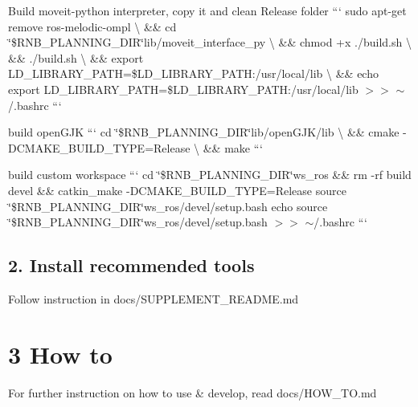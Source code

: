 \begin{DoxyItemize}
\item Build moveit-\/python interpreter, copy it and clean Release folder ``` sudo apt-\/get remove ros-\/melodic-\/ompl \textbackslash{} \&\& cd \char`\"{}\$\+R\+N\+B\+\_\+\+P\+L\+A\+N\+N\+I\+N\+G\+\_\+\+D\+I\+R\char`\"{}lib/moveit\+\_\+interface\+\_\+py \textbackslash{} \&\& chmod +x ./build.sh \textbackslash{} \&\& ./build.sh \textbackslash{} \&\& export L\+D\+\_\+\+L\+I\+B\+R\+A\+R\+Y\+\_\+\+P\+A\+TH=\$\+L\+D\+\_\+\+L\+I\+B\+R\+A\+R\+Y\+\_\+\+P\+A\+TH\+:/usr/local/lib \textbackslash{} \&\& echo \textquotesingle{}export L\+D\+\_\+\+L\+I\+B\+R\+A\+R\+Y\+\_\+\+P\+A\+TH=\$\+L\+D\+\_\+\+L\+I\+B\+R\+A\+R\+Y\+\_\+\+P\+A\+TH\+:/usr/local/lib\textquotesingle{} $>$$>$ $\sim$/.bashrc ```
\item build open\+G\+JK ``` cd \char`\"{}\$\+R\+N\+B\+\_\+\+P\+L\+A\+N\+N\+I\+N\+G\+\_\+\+D\+I\+R\char`\"{}lib/open\+G\+J\+K/lib \textbackslash{} \&\& cmake -\/\+D\+C\+M\+A\+K\+E\+\_\+\+B\+U\+I\+L\+D\+\_\+\+T\+Y\+PE=Release \textbackslash{} \&\& make ```
\item build custom workspace ``` cd \char`\"{}\$\+R\+N\+B\+\_\+\+P\+L\+A\+N\+N\+I\+N\+G\+\_\+\+D\+I\+R\char`\"{}ws\+\_\+ros \&\& rm -\/rf build devel \&\& catkin\+\_\+make -\/\+D\+C\+M\+A\+K\+E\+\_\+\+B\+U\+I\+L\+D\+\_\+\+T\+Y\+PE=Release source \char`\"{}\$\+R\+N\+B\+\_\+\+P\+L\+A\+N\+N\+I\+N\+G\+\_\+\+D\+I\+R\char`\"{}ws\+\_\+ros/devel/setup.\+bash echo \textquotesingle{}source \char`\"{}\$\+R\+N\+B\+\_\+\+P\+L\+A\+N\+N\+I\+N\+G\+\_\+\+D\+I\+R\char`\"{}ws\+\_\+ros/devel/setup.\+bash\textquotesingle{} $>$$>$ $\sim$/.bashrc ```
\end{DoxyItemize}

\subsection*{2. Install recommended tools}


\begin{DoxyItemize}
\item Follow instruction in docs/\+S\+U\+P\+P\+L\+E\+M\+E\+N\+T\+\_\+\+R\+E\+A\+D\+ME.md
\end{DoxyItemize}

\section*{3 How to}


\begin{DoxyItemize}
\item For further instruction on how to use \& develop, read docs/\+H\+O\+W\+\_\+\+TO.md
\end{DoxyItemize}


